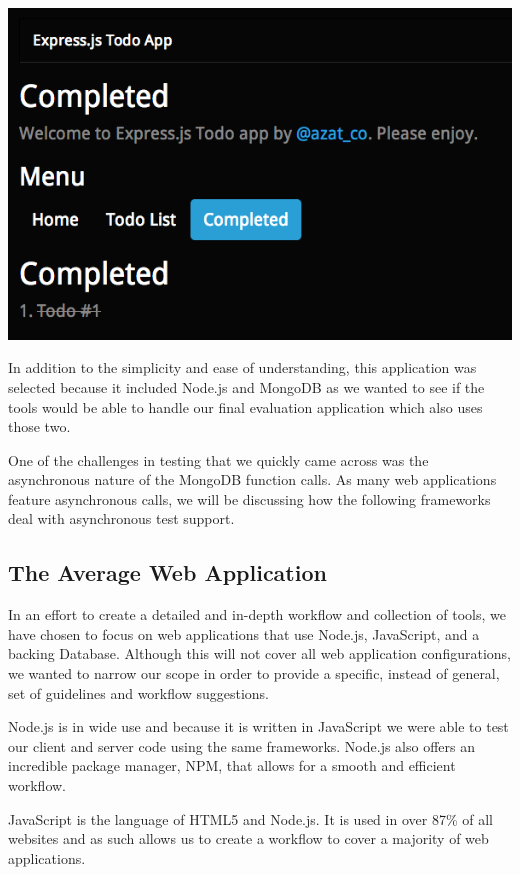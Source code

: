 \documentclass[12pt]{ucthesis}
\newenvironment{Figure}
  {\par\medskip\noindent\minipage{\linewidth}}
  {\endminipage\par\medskip}
\begin{document}
\begin{Figure}
  \centering
  \includegraphics[width=0.75\linewidth]{todo_completed.png} 
\end{Figure}

In addition to the simplicity and ease of understanding, this application was selected because it included Node.js and MongoDB as we wanted to see if the tools would be able to handle our final evaluation application which also uses those two.

One of the challenges in testing that we quickly came across was the asynchronous nature of the MongoDB function calls. As many web applications feature asynchronous calls, we will be discussing how the following frameworks deal with asynchronous test support.

\subsection{The Average Web Application}
In an effort to create a detailed and in-depth workflow and collection of tools, we have chosen to focus on web applications that use Node.js, JavaScript, and a backing Database. Although this will not cover all web application configurations, we wanted to narrow our scope in order to provide a specific, instead of general, set of guidelines and workflow suggestions.

Node.js is in wide use and because it is written in JavaScript we were able to test our client and server code using the same frameworks. Node.js also offers an incredible package manager, NPM, that allows for a smooth and efficient workflow.

JavaScript is the language of HTML5 and Node.js. It is used in over 87\% of all websites\cite{JSUsage} and as such allows us to create a workflow to cover a majority of web applications.
\end{document}
